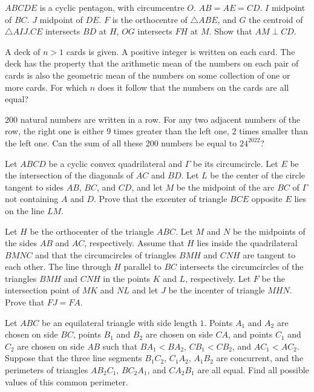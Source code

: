 \documentclass[11pt]{scrartcl}
\begin{document}
\begin{problem}[8811824418974048155]
$ABCDE$ is a cyclic pentagon, with circumcentre $O$. $AB=AE=CD$. $I$ midpoint of $BC$. $J$ midpoint of $DE$. $F$ is the orthocentre of $\triangle ABE$, and $G$ the centroid of $\triangle AIJ$.$CE$ intersects $BD$ at $H$, $OG$ intersects $FH$ at $M$. Show that $AM\perp CD$.
\end{problem}
\begin{problem}[3859961452154270883]
	A deck of $n > 1$ cards is given. A positive integer is written on each card. The deck has the property that the arithmetic mean of the numbers on each pair of cards is also the geometric mean of the numbers on some collection of one or more cards.
For which $n$ does it follow that the numbers on the cards are all equal?
\end{problem}
\begin{problem}[6135851041251773220]
$200$ natural numbers are written in a row. For any two adjacent numbers of the row, the right one is either $9$ times greater than the left one, $2$ times smaller than the left one. Can the sum of all these 200 numbers be equal to $24^{2022}$?
\end{problem}
\begin{problem}[512052756136271]
	Let $ABCD$ be a cyclic convex quadrilateral and $\Gamma$ be its circumcircle. Let $E$ be the intersection of the diagonals of $AC$ and $BD$. Let $L$ be the center of the circle tangent to sides $AB$, $BC$, and $CD$, and let $M$ be the midpoint of the arc $BC$ of $\Gamma$ not containing $A$ and $D$. Prove that the excenter of triangle $BCE$ opposite $E$ lies on the line $LM$.
\end{problem}
\begin{problem}[531504969275602705]
Let $H$ be the orthocenter of the triangle $ABC$. Let $M$ and $N$ be the midpoints of the sides $AB$ and $AC$, respectively. Assume that $H$ lies inside the quadrilateral $BMNC$ and that the circumcircles of triangles $BMH$ and $CNH$ are tangent to each other. The line through $H$ parallel to $BC$ intersects the circumcircles of the triangles $BMH$ and $CNH$ in the points $K$ and $L$, respectively. Let $F$ be the intersection point of $MK$ and $NL$ and let $J$ be the incenter of triangle $MHN$. Prove that $F J = F A$.
\end{problem}
\begin{problem}[803002459788170506]
	Let $ABC$ be an equilateral triangle with side length $1$. Points $A_1$ and $A_2$ are chosen on side $BC$, points $B_1$ and $B_2$ are chosen on side $CA$, and points $C_1$ and $C_2$ are chosen on side $AB$ such that $BA_1<BA_2$, $CB_1<CB_2$, and $AC_1<AC_2$.
Suppose that the three line segments $B_1C_2$, $C_1A_2$, $A_1B_2$ are concurrent, and the perimeters of triangles $AB_2C_1$, $BC_2A_1$, and $CA_2B_1$ are all equal. Find all possible values of this common perimeter.
\end{problem}
\end{document}
